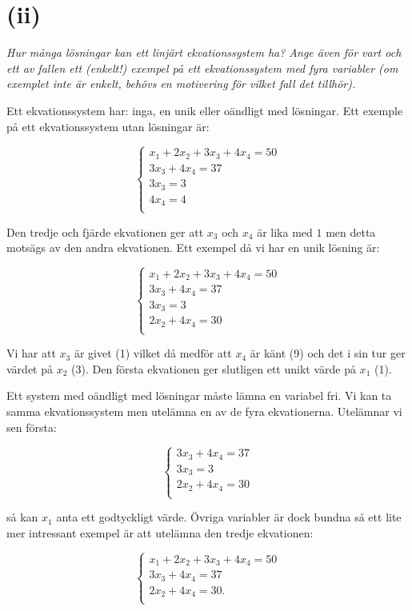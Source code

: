 \documentclass[a4paper, 11pt]{article}
\begin{document}
\section*{(ii)}

{\em Hur många lösningar kan ett linjärt ekvationssystem ha? Ange även för vart och ett av
fallen ett (enkelt!) exempel på ett ekvationssystem med fyra variabler (om exemplet
inte är enkelt, behövs en motivering för vilket fall det tillhör). }

Ett ekvationssystem har: inga, en unik eller oändligt med lösningar.
Ett exemple på ett ekvationssystem utan lösningar är:

$$
\begin{cases}
x_1 + 2x_2 +3x_3 + 4x_4= 50 \\
3x_3 + 4x_4 = 37 \\
3x_3 = 3 \\
4x_4 = 4\\
\end{cases}
$$

Den tredje och fjärde ekvationen ger att $x_3$ och $x_4$ är lika med
$1$ men detta motsägs av den andra ekvationen. Ett exempel då vi har
en unik lösning är:


$$
\begin{cases}
x_1 + 2x_2 +3x_3 + 4x_4= 50\\
3x_3 + 4x_4 = 37 \\
3x_3 = 3 \\
2x_2 + 4x_4 = 30\\
\end{cases}
$$

Vi har att $x_3$ är givet (1) vilket då medför att $x_4$ är känt (9)
och det i sin tur ger värdet på $x_2$ (3). Den första ekvationen ger
slutligen ett unikt värde på $x_1$ (1).

Ett system med oändligt med lösningar måste lämna en variabel fri. Vi
kan ta samma ekvationssystem men utelämna en av de fyra ekvationerna. Utelämnar vi sen första:

$$
\begin{cases}
3x_3 + 4x_4 = 37 \\
3x_3 = 3 \\
2x_2 + 4x_4 = 30\\
\end{cases}
$$

så kan $x_1$ anta ett godtyckligt värde. Övriga variabler är dock
bundna så ett lite mer intressant exempel är att utelämna den tredje
ekvationen:

$$
\begin{cases}
x_1 + 2x_2 +3x_3 + 4x_4= 50\\
3x_3 + 4x_4 = 37 \\
2x_2 + 4x_4 = 30.\\
\end{cases}
$$
\end{document}
